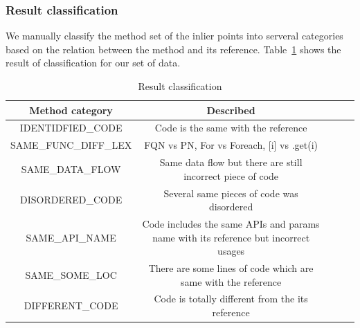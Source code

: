 \subsubsection{Result classification}
We manually classify the method set of the inlier points into serveral categories based on the relation between the method and its reference. Table~\ref{table:result_classification} shows the result of classification for our set of data.
\begin{table}
	\caption{Result classification}
		\begin{tabular}{|c|c|c|c|c|}
			\hline
			Method category & Described \\
			\hline
			IDENTIDFIED\_CODE	& Code is the same with the reference \\		
			\hline
			SAME\_FUNC\_DIFF\_LEX	& FQN vs PN, For vs Foreach, [i] vs .get(i) \\		
			\hline
			SAME\_DATA\_FLOW	& Same data flow but there are still incorrect piece of code \\	
			\hline
			DISORDERED\_CODE & Several same pieces of code was disordered \\		
			\hline
			SAME\_API\_NAME & Code includes the same APIs and params name with its reference but incorrect usages \\
			\hline
			SAME\_SOME\_LOC & There are some lines of code which are same with the reference \\
			\hline
			DIFFERENT\_CODE & Code is totally different from the its reference \\
			\hline
		\end{tabular}
		\label{table:result_classification}
\end{table}